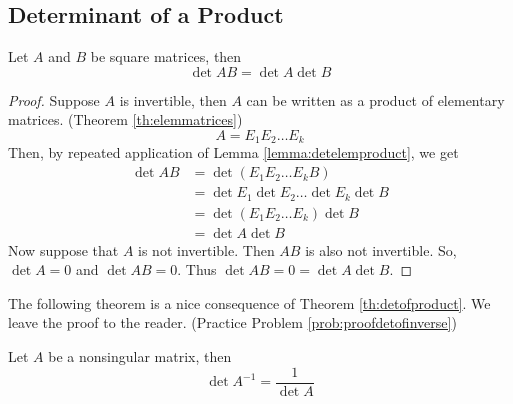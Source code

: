 \documentclass{ximera}
\begin{document}
\subsection*{Determinant of a Product}
\begin{theorem}\label{th:detofproduct}
Let $A$ and $B$ be square matrices, then
$$\det{AB}=\det{A}\det{B}$$
\end{theorem}
\begin{proof}
Suppose $A$ is invertible, then $A$ can be written as a product of elementary matrices. (Theorem \ref{th:elemmatrices}) 
$$A=E_1E_2\ldots E_k$$
Then, by repeated application of Lemma \ref{lemma:detelemproduct}, we get
\begin{align*}\det{AB}&=\det{(E_1E_2\ldots E_kB)}\\
&=\det{E_1}\det{E_2}\ldots \det{E_k}\det{B}\\
&=\det{(E_1E_2\ldots E_k)}\det{B}\\
&=\det{A}\det{B}
\end{align*}
Now suppose that $A$ is not invertible.  Then $AB$ is also not invertible. %
So, $\det{A}=0$ and $\det{AB}=0$.  Thus  $\det{AB}=0=\det{A}\det{B}$.
\end{proof}
The following theorem is a nice consequence of Theorem \ref{th:detofproduct}.  We leave the proof to the reader. (Practice Problem \ref{prob:proofdetofinverse})

\begin{theorem}\label{th:detofinverse} Let $A$ be a nonsingular matrix, then
$$\det{A^{-1}}=\frac{1}{\det{A}}$$
\end{theorem}
\end{document}
